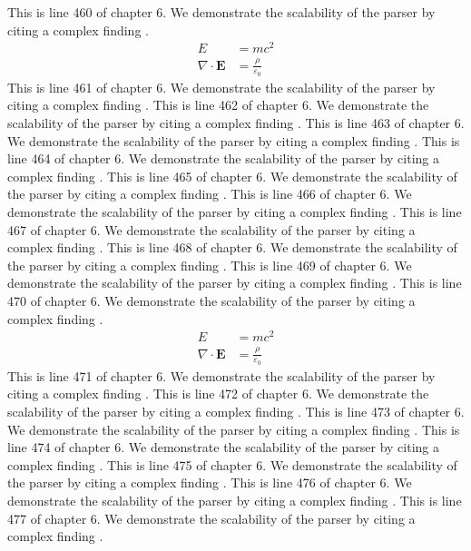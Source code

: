 This is line 460 of chapter 6. We demonstrate the scalability of the parser by citing a complex finding \cite{ref6_460}.
\begin{align*}
  E &= mc^2 \\
  \nabla \cdot \mathbf{E} &= \frac{\rho}{\varepsilon_0}
\end{align*}
This is line 461 of chapter 6. We demonstrate the scalability of the parser by citing a complex finding \cite{ref6_461}.
This is line 462 of chapter 6. We demonstrate the scalability of the parser by citing a complex finding \cite{ref6_462}.
This is line 463 of chapter 6. We demonstrate the scalability of the parser by citing a complex finding \cite{ref6_463}.
This is line 464 of chapter 6. We demonstrate the scalability of the parser by citing a complex finding \cite{ref6_464}.
This is line 465 of chapter 6. We demonstrate the scalability of the parser by citing a complex finding \cite{ref6_465}.
This is line 466 of chapter 6. We demonstrate the scalability of the parser by citing a complex finding \cite{ref6_466}.
This is line 467 of chapter 6. We demonstrate the scalability of the parser by citing a complex finding \cite{ref6_467}.
This is line 468 of chapter 6. We demonstrate the scalability of the parser by citing a complex finding \cite{ref6_468}.
This is line 469 of chapter 6. We demonstrate the scalability of the parser by citing a complex finding \cite{ref6_469}.
This is line 470 of chapter 6. We demonstrate the scalability of the parser by citing a complex finding \cite{ref6_470}.
\begin{align*}
  E &= mc^2 \\
  \nabla \cdot \mathbf{E} &= \frac{\rho}{\varepsilon_0}
\end{align*}
This is line 471 of chapter 6. We demonstrate the scalability of the parser by citing a complex finding \cite{ref6_471}.
This is line 472 of chapter 6. We demonstrate the scalability of the parser by citing a complex finding \cite{ref6_472}.
This is line 473 of chapter 6. We demonstrate the scalability of the parser by citing a complex finding \cite{ref6_473}.
This is line 474 of chapter 6. We demonstrate the scalability of the parser by citing a complex finding \cite{ref6_474}.
This is line 475 of chapter 6. We demonstrate the scalability of the parser by citing a complex finding \cite{ref6_475}.
This is line 476 of chapter 6. We demonstrate the scalability of the parser by citing a complex finding \cite{ref6_476}.
This is line 477 of chapter 6. We demonstrate the scalability of the parser by citing a complex finding \cite{ref6_477}.

